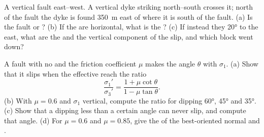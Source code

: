 \begin{exercise}[$\star\star$]\label{exo:b1:faults-folds-fabrics:9}
A vertical fault  east--west. A vertical dyke striking north--south
crosses it; north of the fault the dyke is found \qty{350}{m} east of where
it is south of the fault. (a) Is the fault  or ? (b) If the
 are horizontal, what is the ? (c) If instead they 
\ang{20} to the east, what are the  and the vertical component of the
slip, and which block went down?
\end{exercise}

\begin{exercise}[$\star\star\star$]\label{exo:b1:faults-folds-fabrics:10}
A fault with no  and the friction coefficient $\mu$ makes the angle
$\theta$ with $\sigma_1$. (a) Show that it slips when the effective  reach the ratio
\[
  \frac{\sigma_1'}{\sigma_3'} = \frac{1 + \mu\cot\theta}{1 - \mu\tan\theta} .
\]
(b) With $\mu = 0.6$ and $\sigma_1$ vertical, compute the ratio for  dipping \ang{60}, \ang{45} and \ang{35}. (c) Show that a 
dipping less than a certain angle can never slip, and compute that angle.
(d) For $\mu = 0.6$ and $\mu = 0.85$, give the  of the best-oriented
normal and .
\end{exercise}

